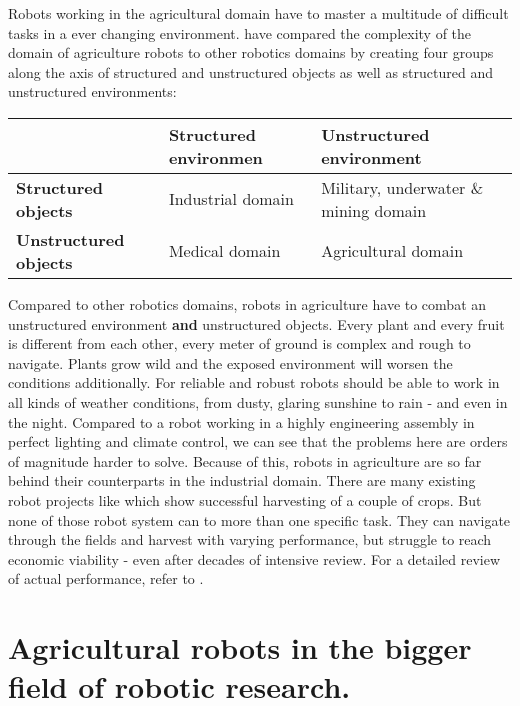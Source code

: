     Robots working in the agricultural domain have to master a multitude of difficult tasks in a ever changing environment. \cite{Bechar2016} have compared the complexity of the domain of agriculture robots to other robotics domains by creating four groups along the axis of structured and unstructured objects as well as structured and unstructured environments: 
    \begin{table}[h]
        \begin{tabular}{@{}lll@{}}
        \toprule
                             & \textbf{Structured environmen} & \textbf{Unstructured environment}                      \\ \midrule
        \textbf{Structured objects}   & Industrial domain      & Military, underwater \& mining domain \\
        \textbf{Unstructured objects} & Medical domain         & Agricultural domain                           \\ \bottomrule
        \end{tabular}
        \label{table:objects_and_tasks}
        \end{table}

    Compared to other robotics domains, robots in agriculture have to combat an unstructured environment \textbf{and} unstructured objects. Every plant and every fruit is different from each other, every meter of ground is complex and rough to navigate. Plants grow wild and the exposed environment will worsen the conditions additionally. For reliable and robust robots should be able to work in all kinds of weather conditions, from dusty, glaring sunshine to rain - and even in the night. Compared to a robot working in a highly engineering assembly in perfect lighting and climate control, we can see that the problems here are orders of magnitude harder to solve. 
    Because of this, robots in agriculture are so far behind their counterparts in the industrial domain. There are many existing robot projects like \cite{Arad2020, Chamanbaz2017, ConesaMunoz2015, Herck2020, Lehnert2020, Wu2020} which show successful harvesting of a couple of crops. But none of those robot system can to more than one specific task. They can navigate through the fields and harvest with varying performance, but struggle to reach economic viability - even after decades of intensive review. For a detailed review of actual performance, refer to \cite{Bac2014, Bechar2017}.

        \section{Agricultural robots in the bigger field of robotic research.}

